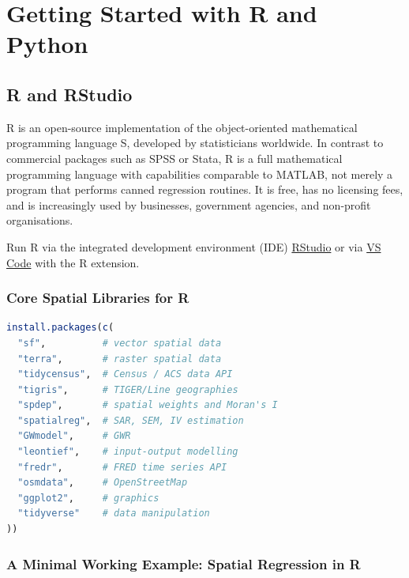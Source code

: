 
\chapter{Getting Started with R and Python}
\label{appx_Software}

\section{R and RStudio}

\textsf{R} is an open-source implementation of the
object-oriented mathematical programming language \textsf{S}, developed by
statisticians worldwide. In contrast to commercial packages such as
\textsf{SPSS} or \textsf{Stata},
\textsf{R} is a full mathematical programming language with capabilities
comparable to \textsf{MATLAB}, not merely a program
that performs canned regression routines. It is free, has no licensing fees,
and is increasingly used by businesses, government agencies, and non-profit
organisations.

Run \textsf{R} via the integrated development environment (IDE)
\href{http://rstudio.org/}{RStudio} or via
\href{https://code.visualstudio.com/}{VS Code} with the R extension.

\subsection{Core Spatial Libraries for R}

\begin{lstlisting}[language=R, caption={Installing core spatial libraries}]
install.packages(c(
  "sf",          # vector spatial data
  "terra",       # raster spatial data
  "tidycensus",  # Census / ACS data API
  "tigris",      # TIGER/Line geographies
  "spdep",       # spatial weights and Moran's I
  "spatialreg",  # SAR, SEM, IV estimation
  "GWmodel",     # GWR
  "leontief",    # input-output modelling
  "fredr",       # FRED time series API
  "osmdata",     # OpenStreetMap
  "ggplot2",     # graphics
  "tidyverse"    # data manipulation
))
\end{lstlisting}

\subsection{A Minimal Working Example: Spatial Regression in R}

